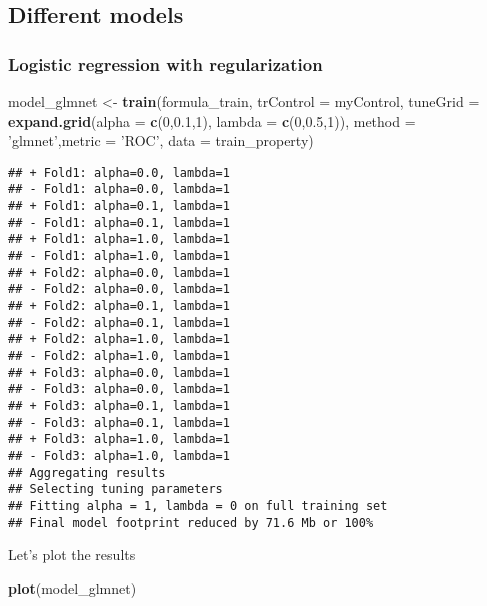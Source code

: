 \documentclass[]{article}
\newenvironment{Shaded}{\begin{snugshade}}{\end{snugshade}}
\newcommand{\KeywordTok}[1]{\textcolor[rgb]{0.13,0.29,0.53}{\textbf{#1}}}
\newcommand{\DataTypeTok}[1]{\textcolor[rgb]{0.13,0.29,0.53}{#1}}
\newcommand{\DecValTok}[1]{\textcolor[rgb]{0.00,0.00,0.81}{#1}}
\newcommand{\FloatTok}[1]{\textcolor[rgb]{0.00,0.00,0.81}{#1}}
\newcommand{\StringTok}[1]{\textcolor[rgb]{0.31,0.60,0.02}{#1}}
\newcommand{\NormalTok}[1]{#1}
\begin{document}
\subsection{Different models}\label{different-models}

\subsubsection{Logistic regression with
regularization}\label{logistic-regression-with-regularization}

\begin{Shaded}
\begin{Highlighting}[]
\NormalTok{model_glmnet <-}\StringTok{ }\KeywordTok{train}\NormalTok{(formula_train, }\DataTypeTok{trControl =}\NormalTok{ myControl, }\DataTypeTok{tuneGrid =} \KeywordTok{expand.grid}\NormalTok{(}\DataTypeTok{alpha =} \KeywordTok{c}\NormalTok{(}\DecValTok{0}\NormalTok{,}\FloatTok{0.1}\NormalTok{,}\DecValTok{1}\NormalTok{), }\DataTypeTok{lambda =} \KeywordTok{c}\NormalTok{(}\DecValTok{0}\NormalTok{,}\FloatTok{0.5}\NormalTok{,}\DecValTok{1}\NormalTok{)),}
                      \DataTypeTok{method =} \StringTok{'glmnet'}\NormalTok{,}\DataTypeTok{metric =} \StringTok{'ROC'}\NormalTok{, }\DataTypeTok{data =}\NormalTok{ train_property)}
\end{Highlighting}
\end{Shaded}

\begin{verbatim}
## + Fold1: alpha=0.0, lambda=1 
## - Fold1: alpha=0.0, lambda=1 
## + Fold1: alpha=0.1, lambda=1 
## - Fold1: alpha=0.1, lambda=1 
## + Fold1: alpha=1.0, lambda=1 
## - Fold1: alpha=1.0, lambda=1 
## + Fold2: alpha=0.0, lambda=1 
## - Fold2: alpha=0.0, lambda=1 
## + Fold2: alpha=0.1, lambda=1 
## - Fold2: alpha=0.1, lambda=1 
## + Fold2: alpha=1.0, lambda=1 
## - Fold2: alpha=1.0, lambda=1 
## + Fold3: alpha=0.0, lambda=1 
## - Fold3: alpha=0.0, lambda=1 
## + Fold3: alpha=0.1, lambda=1 
## - Fold3: alpha=0.1, lambda=1 
## + Fold3: alpha=1.0, lambda=1 
## - Fold3: alpha=1.0, lambda=1 
## Aggregating results
## Selecting tuning parameters
## Fitting alpha = 1, lambda = 0 on full training set
## Final model footprint reduced by 71.6 Mb or 100%
\end{verbatim}

Let's plot the results

\begin{Shaded}
\begin{Highlighting}[]
\KeywordTok{plot}\NormalTok{(model_glmnet)}
\end{Highlighting}
\end{Shaded}
\end{document}
